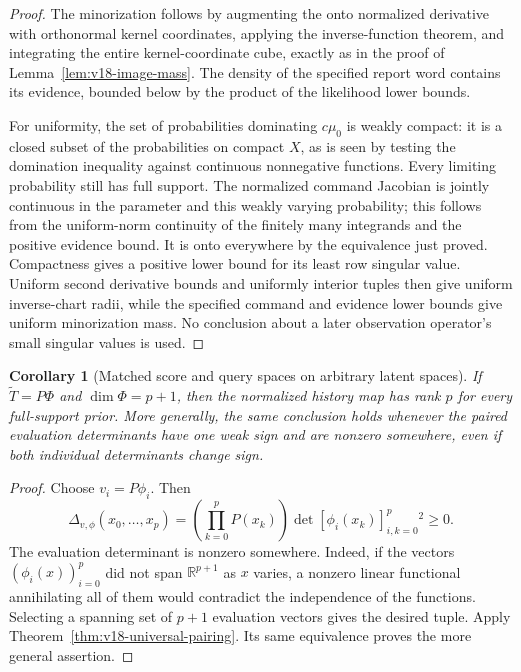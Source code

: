 \documentclass[11pt]{amsart}
\newtheorem{corollary}[theorem]{Corollary}
\theoremstyle{definition}\newtheorem{definition}[theorem]{Definition}
\theoremstyle{remark}\newtheorem{remark}[theorem]{Remark}
\newcommand{\R}{\mathbb R}\newcommand{\N}{\mathbb N}\newcommand{\C}{\mathbb C}
\begin{document}
\begin{proof}
The minorization follows by augmenting the onto normalized derivative
with orthonormal kernel coordinates, applying the inverse-function
theorem, and integrating the entire kernel-coordinate cube, exactly as
in the proof of Lemma~\ref{lem:v18-image-mass}. The density of the
specified report word contains its evidence, bounded below by the
product of the likelihood lower bounds.

For uniformity, the set of probabilities dominating $c\mu_0$ is weakly
compact: it is a closed subset of the probabilities on compact $X$,
as is seen by testing the domination inequality against continuous
nonnegative functions. Every limiting probability still has full
support. The normalized command Jacobian is jointly continuous in the
parameter and this weakly varying probability; this follows from the
uniform-norm continuity of the finitely many integrands and the positive
evidence bound. It is onto everywhere by the equivalence just proved.
Compactness gives a positive lower bound for its least row singular
value. Uniform second derivative bounds and uniformly interior tuples
then give uniform inverse-chart radii, while the specified command and
evidence lower bounds give uniform minorization mass. No conclusion
about a later observation operator's small singular values is used.
\end{proof}

\begin{corollary}[Matched score and query spaces on arbitrary latent spaces]
\label{cor:v18-matched-spaces}
If $\widetilde T=P\Phi$ and $\dim\Phi=p+1$, then the normalized
history map has rank $p$ for every full-support prior. More generally,
the same conclusion holds whenever the paired evaluation determinants
have one weak sign and are nonzero somewhere, even if both individual
determinants change sign.
\end{corollary}
\begin{proof}
Choose $v_i=P\phi_i$. Then
\[
 \Delta_{v,\phi}(x_0,\ldots,x_p)
   =\left(\prod_{k=0}^pP(x_k)\right)
     \det[\phi_i(x_k)]_{i,k=0}^p{}^2\ge0.
\]
The evaluation determinant is nonzero somewhere. Indeed, if the
vectors $(\phi_i(x))_{i=0}^p$ did not span $\R^{p+1}$ as $x$ varies,
a nonzero linear functional annihilating all of them would contradict
the independence of the functions. Selecting a spanning set of $p+1$
evaluation vectors gives the desired tuple. Apply
Theorem~\ref{thm:v18-universal-pairing}. Its same equivalence proves
the more general assertion.
\end{proof}
\end{document}
